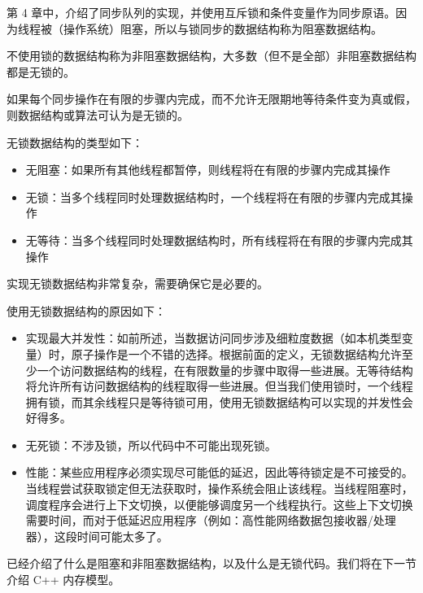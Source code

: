 第 4 章中，介绍了同步队列的实现，并使用互斥锁和条件变量作为同步原语。因为线程被（操作系统）阻塞，所以与锁同步的数据结构称为阻塞数据结构。

不使用锁的数据结构称为非阻塞数据结构，大多数（但不是全部）非阻塞数据结构都是无锁的。

如果每个同步操作在有限的步骤内完成，而不允许无限期地等待条件变为真或假，则数据结构或算法可认为是无锁的。

无锁数据结构的类型如下：

\begin{itemize}
\item
无阻塞：如果所有其他线程都暂停，则线程将在有限的步骤内完成其操作

\item
无锁：当多个线程同时处理数据结构时，一个线程将在有限的步骤内完成其操作

\item
无等待：当多个线程同时处理数据结构时，所有线程将在有限的步骤内完成其操作
\end{itemize}

实现无锁数据结构非常复杂，需要确保它是必要的。

使用无锁数据结构的原因如下：

\begin{itemize}
\item
实现最大并发性：如前所述，当数据访问同步涉及细粒度数据（如本机类型变量）时，原子操作是一个不错的选择。根据前面的定义，无锁数据结构允许至少一个访问数据结构的线程，在有限数量的步骤中取得一些进展。无等待结构将允许所有访问数据结构的线程取得一些进展。但当我们使用锁时，一个线程拥有锁，而其余线程只是等待锁可用，使用无锁数据结构可以实现的并发性会好得多。

\item
无死锁：不涉及锁，所以代码中不可能出现死锁。

\item
性能：某些应用程序必须实现尽可能低的延迟，因此等待锁定是不可接受的。当线程尝试获取锁定但无法获取时，操作系统会阻止该线程。当线程阻塞时，调度程序会进行上下文切换，以便能够调度另一个线程执行。这些上下文切换需要时间，而对于低延迟应用程序（例如：高性能网络数据包接收器/处理器），这段时间可能太多了。
\end{itemize}

已经介绍了什么是阻塞和非阻塞数据结构，以及什么是无锁代码。我们将在下一节介绍 C++ 内存模型。






















